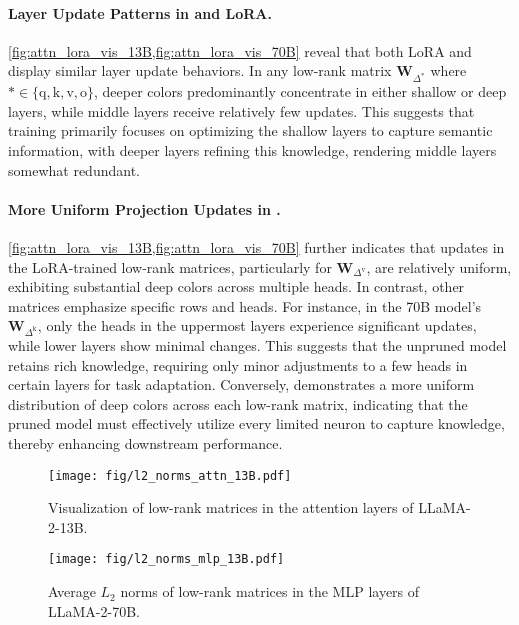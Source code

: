 \paragraph{Layer Update Patterns in \method and LoRA.} \cref{fig:attn_lora_vis_13B,fig:attn_lora_vis_70B} reveal that both LoRA and \method display similar layer update behaviors. In any low-rank matrix \(\mathbf{W}_{\Delta^{*}}\) where \({*} \in \{\text{q}, \text{k}, \text{v}, \text{o}\}\), deeper colors predominantly concentrate in either shallow or deep layers, while middle layers receive relatively few updates. This suggests that training primarily focuses on optimizing the shallow layers to capture semantic information, with deeper layers refining this knowledge, rendering middle layers somewhat redundant.

\paragraph{More Uniform Projection Updates in \method.} \cref{fig:attn_lora_vis_13B,fig:attn_lora_vis_70B} further indicates that updates in the LoRA-trained low-rank matrices, particularly for \(\mathbf{W}_{\Delta^{\text{v}}}\), are relatively uniform, exhibiting substantial deep colors across multiple heads. In contrast, other matrices emphasize specific rows and heads. For instance, in the 70B model's \(\mathbf{W}_{\Delta^{\text{k}}}\), only the heads in the uppermost layers experience significant updates, while lower layers show minimal changes. This suggests that the unpruned model retains rich knowledge, requiring only minor adjustments to a few heads in certain layers for task adaptation. Conversely, \method demonstrates a more uniform distribution of deep colors across each low-rank matrix, indicating that the pruned model must effectively utilize every limited neuron to capture knowledge, thereby enhancing downstream performance.

\begin{figure*}[!ht]
\begin{center}
\texttt{[image: fig/l2\_norms\_attn\_13B.pdf]}
    \caption{Visualization of low-rank matrices in the attention layers of LLaMA-2-13B.}
    \label{fig:attn_lora_vis_13B}
\texttt{[image: fig/l2\_norms\_mlp\_13B.pdf]}
    \caption{Average \(L_{2}\) norms of low-rank matrices in the MLP layers of LLaMA-2-70B.}
    \label{fig:mlp_lora_vis_13B}
\end{center}
\end{figure*}

